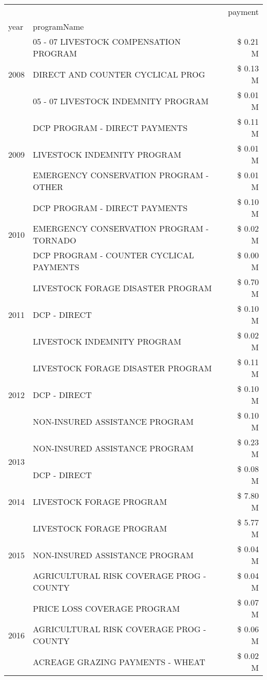 \begin{tabular}{llr}
\toprule
 &  & payment \\
year & programName &  \\
\midrule
\multirow[t]{3}{*}{2008} & 05 - 07 LIVESTOCK COMPENSATION PROGRAM & \$ 0.21 M \\
 & DIRECT AND COUNTER CYCLICAL PROG & \$ 0.13 M \\
 & 05 - 07 LIVESTOCK INDEMNITY PROGRAM & \$ 0.01 M \\
\cline{1-3}
\multirow[t]{3}{*}{2009} & DCP PROGRAM - DIRECT PAYMENTS & \$ 0.11 M \\
 & LIVESTOCK INDEMNITY PROGRAM & \$ 0.01 M \\
 & EMERGENCY CONSERVATION PROGRAM - OTHER & \$ 0.01 M \\
\cline{1-3}
\multirow[t]{3}{*}{2010} & DCP PROGRAM - DIRECT PAYMENTS & \$ 0.10 M \\
 & EMERGENCY CONSERVATION PROGRAM - TORNADO & \$ 0.02 M \\
 & DCP PROGRAM - COUNTER CYCLICAL PAYMENTS & \$ 0.00 M \\
\cline{1-3}
\multirow[t]{3}{*}{2011} & LIVESTOCK FORAGE DISASTER PROGRAM & \$ 0.70 M \\
 & DCP - DIRECT & \$ 0.10 M \\
 & LIVESTOCK INDEMNITY PROGRAM & \$ 0.02 M \\
\cline{1-3}
\multirow[t]{3}{*}{2012} & LIVESTOCK FORAGE DISASTER PROGRAM & \$ 0.11 M \\
 & DCP - DIRECT & \$ 0.10 M \\
 & NON-INSURED ASSISTANCE PROGRAM & \$ 0.10 M \\
\cline{1-3}
\multirow[t]{2}{*}{2013} & NON-INSURED ASSISTANCE PROGRAM & \$ 0.23 M \\
 & DCP - DIRECT & \$ 0.08 M \\
\cline{1-3}
2014 & LIVESTOCK FORAGE PROGRAM & \$ 7.80 M \\
\cline{1-3}
\multirow[t]{3}{*}{2015} & LIVESTOCK FORAGE PROGRAM & \$ 5.77 M \\
 & NON-INSURED ASSISTANCE PROGRAM & \$ 0.04 M \\
 & AGRICULTURAL RISK COVERAGE PROG - COUNTY & \$ 0.04 M \\
\cline{1-3}
\multirow[t]{3}{*}{2016} & PRICE LOSS COVERAGE PROGRAM & \$ 0.07 M \\
 & AGRICULTURAL RISK COVERAGE PROG - COUNTY & \$ 0.06 M \\
 & ACREAGE GRAZING PAYMENTS - WHEAT & \$ 0.02 M \\

\end{tabular}
